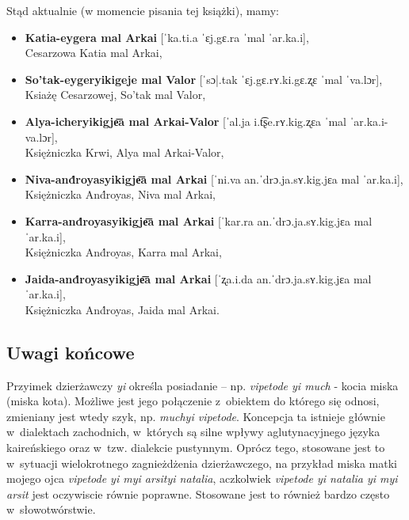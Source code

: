 \begin{spacing}{1.1}
Stąd aktualnie (w momencie pisania tej książki), mamy:

\begin{itemize}
\item \textbf{Katia-eygera mal Arkai} [ˈka.ti.a ˈɛj.gɛ.ra ˈmal ˈar.ka.i],\\ 
Cesarzowa Katia mal Arkai,
\item \textbf{So'tak-eygeryikigeje mal Valor} [ˈsɔ|.tak ˈɛj.gɛ.rʏ.ki.gɛ.ʐɛ 
ˈmal ˈva.lɔr],\\ Ksiażę Cesarzowej, So'tak mal Valor,
\item \textbf{Alya-icheryikigje͞a mal Arkai-Valor} [ˈal.ja i.t͡ʂe.rʏ.kig.ʐɛa ˈmal 
ˈar.ka.i-va.lɔr],\\ Księżniczka Krwi, Alya mal Arkai-Valor,
\item \textbf{Niva-and́royasyikigje͞a mal Arkai} [ˈni.va an.ˈdrɔ.ja.sʏ.kig.jɛa 
mal ˈar.ka.i],\\ Księżniczka And́royas, Niva mal Arkai,
\item \textbf{Karra-and́royasyikigje͞a mal Arkai} [ˈkar.ra an.ˈdrɔ.ja.sʏ.kig.jɛa 
mal ˈar.ka.i],\\ Księżniczka And́royas, Karra mal Arkai,
\item \textbf{Jaida-and́royasyikigje͞a mal Arkai} [ˈʐa.i.da an.ˈdrɔ.ja.sʏ.kig.jɛa
mal ˈar.ka.i],\\ Księżniczka And́royas, Jaida mal Arkai.
\end{itemize}


\subsection{Uwagi końcowe}

Przyimek dzierżawczy \emph{yi} określa posiadanie -- np. \emph{vipetode yi much}
- kocia miska (miska kota). Możliwe jest jego połączenie z~obiektem do którego 
się odnosi, zmieniany jest wtedy szyk, np. \emph{muchyi vipetode}. Koncepcja ta 
istnieje głównie w~dialektach zachodnich, w~których są silne wpływy 
aglutynacyjnego języka kaireńskiego oraz w~tzw. dialekcie pustynnym. Oprócz 
tego, stosowane jest to w~sytuacji wielokrotnego zagnieżdżenia dzierżawczego, 
na przykład miska matki mojego ojca \emph{vipetode yi myi arsityi natalia}, 
aczkolwiek \emph{vipetode yi natalia yi myi arsit} jest oczywiscie równie 
poprawne. Stosowane jest to również bardzo często w~słowotwórstwie.

\end{spacing}
